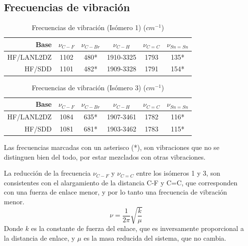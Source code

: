 \documentclass[12pt]{article}
\begin{document}
\subsection {Frecuencias de vibración}
\begin{table}[H]
    \centering
    \begin{tabular}{rccccc}
        \hline
        Base        & $\nu_{C-F}$ & $\nu_{C-Br}$ & $\nu_{C-H}$ & $\nu_{C=C}$ & $\nu_{Sn=Sn}$ \\
        \hline
        HF/LANL2DZ  & 1102        & 480*         & 1910-3325   & 1793        & 135*          \\
        HF/SDD      & 1101        & 482*         & 1909-3328   & 1791        & 154*          \\
        \hline
    \end{tabular}
    \caption{Frecuencias de vibración (Isómero 1) ($cm^{-1}$) }
\end{table}

\begin{table}[H]
    \centering
    \begin{tabular}{rccccc}
        \hline
        Base       & $\nu_{C-F}$ & $\nu_{C-Br}$ & $\nu_{C-H}$ & $\nu_{C=C}$ & $\nu_{Sn=Sn}$ \\
        \hline
        HF/LANL2DZ  & 1084       & 635*         & 1907-3461   & 1782        & 116*          \\
        HF/SDD      & 1081       & 681*         & 1903-3462   & 1783        & 115*          \\
        \hline
    \end{tabular}
    \caption{Frecuencias de vibración (Isómero 3) ($cm^{-1}$)}
\end{table}

Las frecuencias marcadas con un asterisco (*), son vibraciones que no se distinguen bien del todo, por estar mezclados con otras vibraciones.


La reducción de la frecuencia $\nu_{C-F}$ y $\nu_{C=C}$ entre los isómeros 1 y 3, son consistentes con el alargamiento de la distancia C-F y C=C, que corresponden con una fuerza de enlace menor, y por lo tanto una frecuencia de vibración menor.
\[\nu=\frac{1}{2\pi}\sqrt{\frac{k}{\mu}}\]
Donde $k$ es la constante de fuerza del enlace, que es inversamente proporcional a la distancia de enlace, y $\mu$ es la masa reducida del sistema, que no cambia.




\newpage
\end{document}
